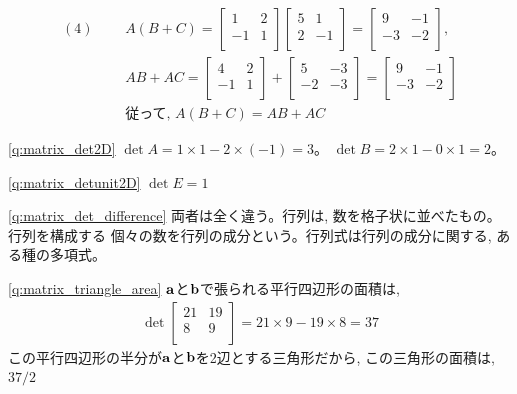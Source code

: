 \begin{eqnarray*}
(4)\,\,\,\,&&A(B+C)=
\begin{bmatrix}
1 & 2 \\
-1 & 1 \\
\end{bmatrix}
\begin{bmatrix}
5 & 1 \\
2 & -1 \\
\end{bmatrix}
=\begin{bmatrix}
9 & -1 \\
-3 & -2 \\
\end{bmatrix}
, \\
&&AB+AC=
\begin{bmatrix}
4 & 2 \\
-1 & 1 \\
\end{bmatrix}
+\begin{bmatrix}
5 & -3 \\
-2 & -3 \\
\end{bmatrix}
=\begin{bmatrix}
9 & -1 \\
-3 & -2 \\
\end{bmatrix}\\
&&\text{従って, }A(B+C)=AB+AC
\end{eqnarray*}
\mv



%
\ref{q:matrix_det2D} 
$\det A=1\times1-2\times(-1)=3$。
$\det B=2\times1-0\times1=2$。
\mv

%
\ref{q:matrix_detunit2D}  $\det E =1$
\mv

%
\ref{q:matrix_det_difference} 
両者は全く違う。行列は, 数を格子状に並べたもの。行列を構成する
個々の数を行列の成分という。行列式は行列の成分に関する, ある種の多項式。
\mv

%
\ref{q:matrix_triangle_area} 
$\bf a$と$\bf b$で張られる平行四辺形の面積は, 
\begin{eqnarray*}\det
\begin{bmatrix}
21 & 19 \\
8 & 9 \\
\end{bmatrix}
=21\times9-19\times8=37\end{eqnarray*}
この平行四辺形の半分が${\bf a}$と${\bf b}$を2辺とする三角形だから, 
この三角形の面積は, $37/2$
\mv

